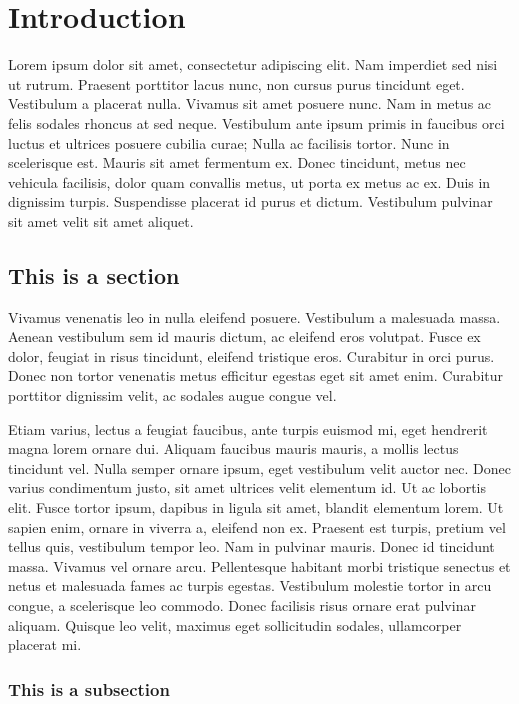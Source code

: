 \chapter{Introduction} \label{cha:intro}

	Lorem ipsum dolor sit amet, consectetur adipiscing elit. Nam imperdiet sed nisi ut rutrum. Praesent porttitor lacus nunc, non cursus purus tincidunt eget. Vestibulum a placerat nulla. Vivamus sit amet posuere nunc. Nam in metus ac felis sodales rhoncus at sed neque. Vestibulum ante ipsum primis in faucibus orci luctus et ultrices posuere cubilia curae; Nulla ac facilisis tortor. Nunc in scelerisque est. Mauris sit amet fermentum ex. Donec tincidunt, metus nec vehicula facilisis, dolor quam convallis metus, ut porta ex metus ac ex. Duis in dignissim turpis. Suspendisse placerat id purus et dictum. Vestibulum pulvinar sit amet velit sit amet aliquet.

	\section{This is a section} \label{sec:first_thing}

	Vivamus venenatis leo in nulla eleifend posuere. Vestibulum a malesuada massa. Aenean vestibulum sem id mauris dictum, ac eleifend eros volutpat. Fusce ex dolor, feugiat in risus tincidunt, eleifend tristique eros. Curabitur in orci purus. Donec non tortor venenatis metus efficitur egestas eget sit amet enim. Curabitur porttitor dignissim velit, ac sodales augue congue vel.

	Etiam varius, lectus a feugiat faucibus, ante turpis euismod mi, eget hendrerit magna lorem ornare dui. Aliquam faucibus mauris mauris, a mollis lectus tincidunt vel. Nulla semper ornare ipsum, eget vestibulum velit auctor nec. Donec varius condimentum justo, sit amet ultrices velit elementum id. Ut ac lobortis elit. Fusce tortor ipsum, dapibus in ligula sit amet, blandit elementum lorem. Ut sapien enim, ornare in viverra a, eleifend non ex. Praesent est turpis, pretium vel tellus quis, vestibulum tempor leo. Nam in pulvinar mauris. Donec id tincidunt massa. Vivamus vel ornare arcu. Pellentesque habitant morbi tristique senectus et netus et malesuada fames ac turpis egestas. Vestibulum molestie tortor in arcu congue, a scelerisque leo commodo. Donec facilisis risus ornare erat pulvinar aliquam. Quisque leo velit, maximus eget sollicitudin sodales, ullamcorper placerat mi.

	\subsection{This is a subsection} \label{sec:second_thing}

